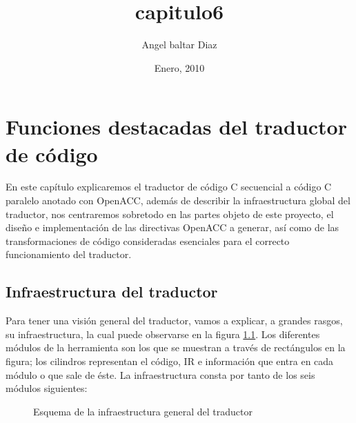 


\title{capitulo6} 
\author{Angel baltar Diaz}
\date{\Large Enero, 2010} 

\chapter {Funciones destacadas del traductor de código}
\label{capitulo6}

En este capítulo explicaremos el traductor de código C secuencial a código C paralelo anotado con OpenACC, además de describir la infraestructura global del traductor, nos centraremos sobretodo en las partes objeto de este proyecto, el diseño e implementación de las directivas OpenACC a generar, así como de las transformaciones de código consideradas esenciales para el correcto funcionamiento del traductor.

\section{Infraestructura del traductor}
Para tener una visión general del traductor, vamos a explicar, a grandes rasgos, su infraestructura, la cual puede observarse en la figura \ref{fig:infraestructura}. Los diferentes módulos de la herramienta son los que se muestran a través de rectángulos en la figura; los cilindros representan el código, IR e información que entra en cada módulo o que sale de éste. La infraestructura consta por tanto de los seis módulos siguientes:

\begin{figure}[t]
\begin{center}
\caption{Esquema de la infraestructura general del traductor}
\label{fig:infraestructura}
\end{center}
\end{figure}
%

